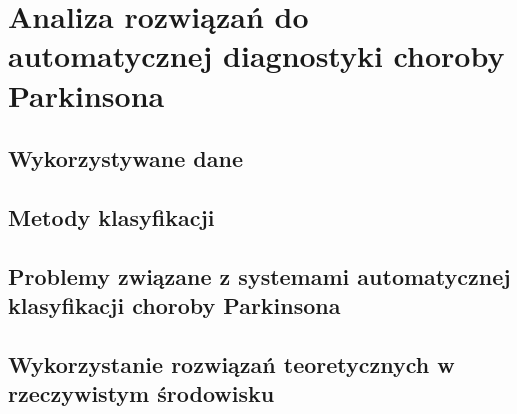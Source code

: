 \chapter{Analiza rozwiązań do automatycznej diagnostyki choroby Parkinsona}\label{ch:analiza-rozwiazan}


\section{Wykorzystywane dane}\label{sec:dane-przeglad}


\section{Metody klasyfikacji}\label{sec:metody-klasyfikacji}


\section{Problemy związane z systemami automatycznej klasyfikacji choroby Parkinsona}\label{sec:problemy}

\section{Wykorzystanie rozwiązań teoretycznych w rzeczywistym środowisku}\label{sec:teoria-vs-praktyka}



